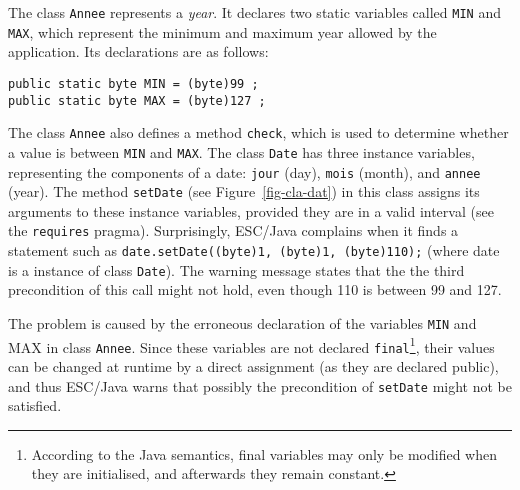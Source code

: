 \documentclass[a4paper]{llncs}
\begin{document}
The class \texttt{Annee} represents a \textit{year}. It 
declares two
static variables called \texttt{MIN} and \texttt{MAX}, which represent
the minimum and maximum year allowed by the application.
Its declarations are as follows:
\begin{verbatim}
public static byte MIN = (byte)99 ;
public static byte MAX = (byte)127 ;
\end{verbatim}

The class \texttt{Annee} also defines a method \texttt{check}, which is
used to determine whether a value is between \texttt{MIN} and \texttt{MAX}. The
class \texttt{Date} has three instance variables, representing the
components of a date: \texttt{jour} (day),
\texttt{mois} (month), and \texttt{annee} (year). The method
\texttt{setDate} (see Figure~\ref{fig-cla-dat})
in this class assigns its arguments to these
instance variables, provided they are in a valid interval (see the
\texttt{requires} pragma). %
Surprisingly, ESC/Java complains when it
finds a statement such as
\mbox{\tt date.setDate((byte)1, (byte)1, (byte)110);} (where date is a
instance of class \texttt{Date}). The warning message states that the
the third precondition of this call might not hold, even though 110 is 
between 99 and 127.

The problem is caused by the erroneous declaration of the variables 
\texttt{MIN} and \textsc{MAX} in class \texttt{Annee}.
Since these variables are not declared 
\texttt{final}\footnote{According to the Java semantics, final
variables may only be modified when they are initialised, and
afterwards they remain constant.}, their values can be changed at
runtime by a direct assignment (as they are declared public), and thus
ESC/Java warns that possibly the precondition of \texttt{setDate}
might not be satisfied.
\end{document}
